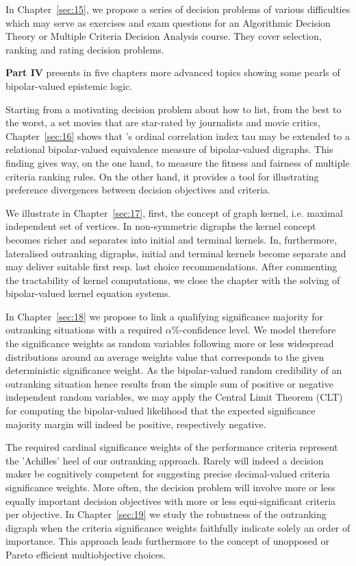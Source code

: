 In Chapter~\vref{sec:15}, we propose a series of decision problems of various difficulties which may serve as exercises and exam questions for an Algorithmic Decision Theory or Multiple Criteria Decision Analysis course. They cover selection, ranking and rating decision problems.
\vspace{0.5cm}

\textbf{Part IV} presents in five chapters more advanced topics showing some pearls of bipolar-valued epistemic logic.

Starting from a motivating decision problem about how to list, from the best to the worst, a set movies that are star-rated by journalists and movie critics, Chapter~\vref{sec:16} shows that \Kendall’s ordinal correlation index tau may be extended to a relational bipolar-valued equivalence measure of bipolar-valued digraphs. This finding gives way, on the one hand, to measure the fitness and fairness of multiple criteria ranking rules. On the other hand, it provides a tool for illustrating preference divergences between decision objectives and criteria.

We illustrate in Chapter~\vref{sec:17}, first, the concept of graph kernel, i.e. maximal independent set of vertices. In non-symmetric digraphs the kernel concept becomes richer and separates into initial and terminal kernels. In, furthermore, lateralised outranking digraphs, initial and terminal kernels become separate and may deliver suitable first resp. last choice recommendations. After commenting the tractability of kernel computations, we close the chapter with the solving of bipolar-valued kernel equation systems.

In Chapter~\vref{sec:18} we propose to link a qualifying significance majority for outranking situations with a required $\alpha\%$-confidence level. We model therefore the significance weights as random variables following more or less widespread distributions around an average weights value that corresponds to the given deterministic significance weight. As the bipolar-valued random credibility of an outranking situation hence results from the simple sum of positive or negative independent random variables, we may apply the Central Limit Theorem (CLT) for computing the bipolar-valued likelihood that the expected significance majority margin will indeed be positive, respectively negative.

The required cardinal significance weights of the performance criteria represent the ’Achilles’ heel of our outranking approach. Rarely will indeed a decision maker be cognitively competent for suggesting precise decimal-valued criteria significance weights. More often, the decision problem will involve more or less equally important decision objectives with more or less equi-significant criteria per objective. In Chapter~\vref{sec:19} we study the robustness of the outranking digraph when the criteria significance weights faithfully indicate solely an order of importance. This approach leads furthermore to the concept of unopposed or Pareto efficient multiobjective choices.

